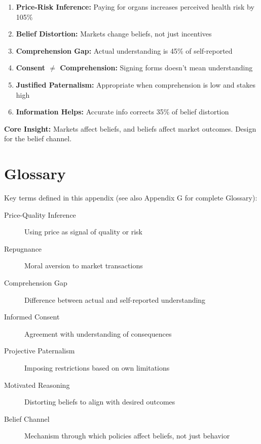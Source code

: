 \begin{tcolorbox}[colback=gray!10!white,colframe=gray!50!black,title=Key Takeaways]
\begin{enumerate}
    \item \textbf{Price-Risk Inference:} Paying for organs increases perceived health risk by 105\%
    \item \textbf{Belief Distortion:} Markets change beliefs, not just incentives
    \item \textbf{Comprehension Gap:} Actual understanding is 45\% of self-reported
    \item \textbf{Consent $\neq$ Comprehension:} Signing forms doesn't mean understanding
    \item \textbf{Justified Paternalism:} Appropriate when comprehension is low and stakes high
    \item \textbf{Information Helps:} Accurate info corrects 35\% of belief distortion
\end{enumerate}

\textbf{Core Insight:} Markets affect beliefs, and beliefs affect market outcomes. Design for the belief channel.
\end{tcolorbox}

\section{Glossary}

Key terms defined in this appendix (see also Appendix G for complete Glossary):

\begin{description}
    \item[Price-Quality Inference] Using price as signal of quality or risk
    \item[Repugnance] Moral aversion to market transactions
    \item[Comprehension Gap] Difference between actual and self-reported understanding
    \item[Informed Consent] Agreement with understanding of consequences
    \item[Projective Paternalism] Imposing restrictions based on own limitations
    \item[Motivated Reasoning] Distorting beliefs to align with desired outcomes
    \item[Belief Channel] Mechanism through which policies affect beliefs, not just behavior
\end{description}

